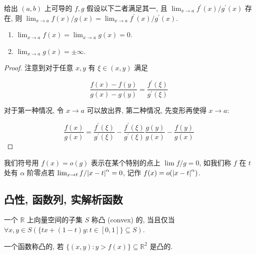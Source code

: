 \begin{theorem}[L'Hospital 法则]
    给出 \((a,b)\) 上可导的 \(f,g\) 假设以下二者满足其一, 且 \(\lim_{x \to a} f^\prime (x)/g^\prime (x)\) 存在, 则 \(\lim_{x \to a} f(x)/g(x) = \lim_{x \to a} f^\prime (x)/g^\prime (x)\).

    \begin{enumerate}
        \item \(\lim_{x \to a} f(x) = \lim_{x \to a} g(x) = 0\).
        \item \(\lim_{x \to a} g(x) = \pm \infty\).
    \end{enumerate}

    \begin{proof}
        注意到对于任意 \(x,y\) 有 \(\xi \in (x,y)\) 满足

        \[
            \frac{f(x) - f(y)}{g(x) - g(y)} = \frac{f^\prime (\xi)}{g^\prime (\xi)}
        \]

        对于第一种情况, 令 \(x \to a\) 可以放出界, 第二种情况, 先变形再使得 \(x \to a\):

        \[
            \frac{f(x)}{g(x)} = \frac{f^\prime (\xi)}{g^\prime (\xi)} - \frac{f^\prime (\xi)}{g^\prime (\xi)} \frac{g(y)}{g(x)} - \frac{f(y)}{g(x)}
        \]
    \end{proof}
\end{theorem}

\begin{definition}[Landau 符号]
    我们符号用 \(f(x) = o(g)\) 表示在某个特别的点上 \(\lim f/g = 0\),
    如我们称 \(f\) 在 \(t\) 处有 \(\alpha\) 阶零点若 \(\lim_{x \to t} f/\abs{x-t}^\alpha = 0\),
    记作 \(f (x) = o(\abs{x-t}^\alpha)\).
\end{definition}

\subsection{凸性, 函数列, 实解析函数}

\begin{definition}[凸]
    一个 \(\mathbb{R}\) 上向量空间的子集 \(S\) 称凸 (convex) 的, 当且仅当 \(\forall x,y \in S (\{tx + (1-t)y : t \in [0,1]\} \subseteq S)\).
\end{definition}

\begin{lemma}
    一个函数称凸的, 若 \(\{(x,y) : y > f(x)\} \subseteq \mathbb{R}^2\) 是凸的.
\end{lemma}

